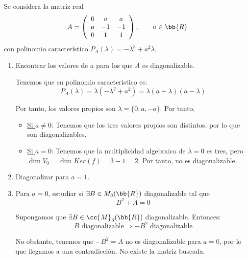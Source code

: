 \documentclass[12pt]{article}
\begin{document}
    \begin{ejercicio}
Se considera la matriz real
\begin{equation*}
    A=\left(\begin{array}{ccc}
        0 & a & a \\
        a & -1 & -1 \\
        0 & 1 & 1
    \end{array}\right), \qquad a\in \bb{R}
\end{equation*}
con polinomio característico $P_A(\lambda)=-\lambda^3+a^2\lambda$.

\begin{enumerate}
    \item Encontrar los valores de $a$ para los que $A$ es diagonalizable.

    Tenemos que su polinomio característico es:
    \begin{equation*}
        P_A(\lambda)=\lambda(-\lambda^2 +a^2)=\lambda(a+\lambda)(a-\lambda)
    \end{equation*}

    Por tanto, los valores propios son $\lambda=\{0,a,-a\}$. Por tanto,
    \begin{itemize}
        \item \underline{Si $a\neq0$}: Tenemos que los tres valores propios son distintos, por lo que son diagonalizables.

        \item \underline{Si $a=0$}: Tenemos que la multiplicidad algebraica de $\lambda=0$ es tres, pero $\dim V_0=\dim Ker (f)=3-1=2$. Por tanto, no es diagonalizable.
    \end{itemize}

    \item Diagonalizar para $a=1$.

    \item Para $a=0$, estudiar si $\exists B\in M_3(\bb{R})$ diagonalizable tal que $$B^2+A=0$$

    Supongamos que $\exists B\in \cc{M}_3(\bb{R})$ diagonalizable. Entonces:
    \begin{equation*}
        B \text{ diagonalizable} \Longrightarrow
        -B^2 \text{ diagonalizable}
    \end{equation*}

    No obstante, tenemos que $-B^2=A$ no es diagonalizable para $a=0$, por lo que llegamos a una contradicción. No existe la matriz buscada.

    
\end{enumerate}

\end{ejercicio}
\end{document}

